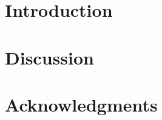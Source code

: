 
\section{Introduction}
\label{sec:intro}
\section{Discussion} \label{sec:discussion}

\section*{Acknowledgments}
